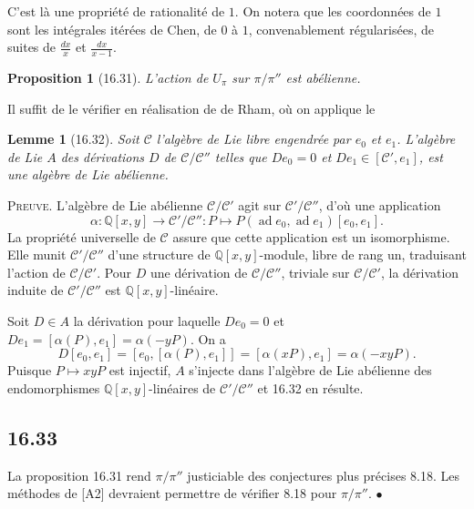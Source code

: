 \documentclass[12pt,a4paper]{article}
\theoremstyle{plain}
\newtheorem{lemma}[theorem]{Lemme}
\newtheorem{proposition}[theorem]{Proposition}
\theoremstyle{definition}
\theoremstyle{remark}
\DeclareMathOperator{\ad}{ad}
\newcommand{\QQ}{\mathbb{Q}}
\begin{document}
C'est l\`a une propri\'et\'e de rationalit\'e de $1$. On notera que les
coordonn\'ees de $1$ sont les int\'egrales it\'er\'ees de Chen, de $0$
\`a $1$, convenablement r\'egularis\'ees, de suites de $\frac{dx}{x}$ et
$\frac{dx}{x-1}$.

\begin{proposition}[16.31]\label{prop:16.31}
L'action de $U_\pi$ sur $\pi/\pi''$ est ab\'elienne.
\end{proposition}

Il suffit de le v\'erifier en r\'ealisation de de Rham, o\`u on applique
le

\begin{lemma}[16.32]\label{lem:16.32}
Soit $\mathcal{C}$ l'alg\`ebre de Lie libre engendr\'ee par $e_0$ et $e_1$.
L'alg\`ebre de Lie $A$ des d\'erivations $D$ de $\mathcal{C}/\mathcal{C}''$
telles que $De_0 = 0$ et $De_1 \in [\mathcal{C}',e_1]$, est une alg\`ebre
de Lie ab\'elienne.
\end{lemma}

\noindent \textsc{Preuve.} L'alg\`ebre de Lie ab\'elienne
$\mathcal{C}/\mathcal{C}'$ agit sur $\mathcal{C}'/\mathcal{C}''$, d'o\`u
une application
\[
\alpha : \QQ[x,y] \to \mathcal{C}'/\mathcal{C}'' : P \mapsto P(\ad
e_0, \ad e_1)[e_0,e_1].
\]
La propri\'et\'e universelle de $\mathcal{C}$ assure que cette application
est un isomorphisme. Elle munit $\mathcal{C}'/\mathcal{C}''$ d'une structure
de $\QQ[x,y]$-module, libre de rang un, traduisant l'action de
$\mathcal{C}/\mathcal{C}'$. Pour $D$ une d\'erivation de
$\mathcal{C}/\mathcal{C}''$, triviale sur $\mathcal{C}/\mathcal{C}'$, la
d\'erivation induite de $\mathcal{C}'/\mathcal{C}''$ est
$\QQ[x,y]$-lin\'eaire.

Soit $D \in A$ la d\'erivation pour laquelle $De_0 = 0$ et
$De_1 = [\alpha(P), e_1] = \alpha(-yP)$. On a
\[
D[e_0,e_1] = [e_0, [\alpha(P),e_1]] = [\alpha(xP), e_1] =
\alpha(-xyP).
\]
Puisque $P \mapsto xyP$ est injectif, $A$ s'injecte dans l'alg\`ebre de
Lie ab\'elienne des endomorphismes $\QQ[x,y]$-lin\'eaires de
$\mathcal{C}'/\mathcal{C}''$ et 16.32 en r\'esulte.

\subsection*{16.33}

La proposition 16.31 rend $\pi/\pi''$ justiciable des conjectures plus
pr\'ecises 8.18. Les m\'ethodes de [A2] devraient permettre de
v\'erifier 8.18 pour $\pi/\pi''$. \hfill $\bullet$
\end{document}
